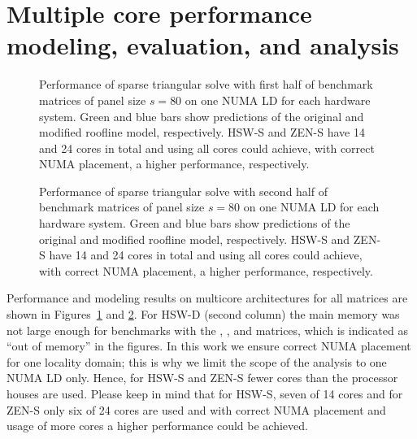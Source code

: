 
\section{Multiple core performance modeling, evaluation, and analysis}
\label{sec:performance:multicore}

\begin{figure}[tp]%
  \centering%
  \begin{adjustbox}{angle=90}
  \end{adjustbox}
  \caption{Performance of sparse triangular solve with first half of benchmark matrices of
panel size $s=80$ on one NUMA LD for each hardware system.
  Green and blue bars show predictions of the original and modified roofline
model, respectively.
  HSW-S and ZEN-S have 14 and 24 cores in total and using all cores could
achieve, with correct NUMA placement, a higher performance, respectively.}
  \label{fig:p:pardiso-1}
\end{figure}

\begin{figure}[tp]%
  \centering%
  \begin{adjustbox}{angle=90}
  \end{adjustbox}
  \caption{Performance of sparse triangular solve with second half of benchmark matrices of
panel size $s=80$ on one NUMA LD for each hardware system.
  Green and blue bars show predictions of the original and modified roofline
model, respectively.
  HSW-S and ZEN-S have 14 and 24 cores in total and using all cores could
achieve, with correct NUMA placement, a higher performance, respectively.}
  \label{fig:p:pardiso-2}
\end{figure}

Performance and modeling results on multicore architectures for all matrices are shown in Figures~\ref{fig:p:pardiso-1} and \ref{fig:p:pardiso-2}.
For HSW-D (second column) the main memory was not large enough for benchmarks
with the , , and  matrices, which is
indicated as ``out of memory'' in the figures.
%
%
In this work we ensure correct NUMA placement for one locality domain; this is why
we limit the scope of the analysis to one NUMA LD only. 
Hence, for HSW-S and ZEN-S fewer cores than the processor houses are used.
Please keep in mind that for HSW-S, seven of 14 cores and for ZEN-S only six of
24 cores are used and with correct NUMA placement and usage of more cores a
higher performance could be achieved.

